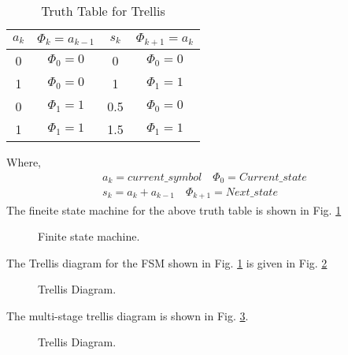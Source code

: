 \documentclass[journal,12pt,twocolumn]{IEEEtran}
\begin{document}
\begin{table}[h]
\caption{Truth Table for Trellis}
\begin{center}
\begin{tabular}{|c|c|c|c|}
\hline
$a_k$ & $\Phi_k = a_{k-1}$ & $s_k$ & $\Phi_{k+1} = a_{k}$ \\
    \hline
    0 &   $\Phi_0 = 0$ & 0 & $\Phi_0 = 0$\\ 
    \hline
    1 &  $\Phi_0 = 0$ & 1 & $\Phi_1 = 1$ \\
    \hline
    0 &  $\Phi_1 = 1$ & 0.5 & $\Phi_0 = 0$ \\
	\hline
	1 &  $\Phi_1 = 1$ & 1.5 & $\Phi_1 = 1$ \\
	\hline
\end{tabular}
\label{table:truthtable}
\end{center}
\end{table}
Where,
\begin{align}
a_k = current\_symbol \quad \Phi_0 = Current\_state \\
s_k = a_k + a_{k-1} \quad \Phi_{k+1} = Next\_state 
\end{align}
The fineite state machine for the above truth table is shown in Fig. \ref{fig:FSM}
\begin{figure}[h]
\centering
\resizebox{\columnwidth}{!}{

}
\caption{Finite state machine. }
\label{fig:FSM}
\end{figure}
The Trellis diagram for the FSM shown in Fig. \ref{fig:FSM} is given in Fig. \ref{fig:trellis}
\begin{figure}[h]
\centering
\resizebox{\columnwidth}{!}{

}
\caption{Trellis Diagram. }
\label{fig:trellis}
\end{figure}

The multi-stage trellis diagram is shown in Fig. \ref{fig:multi-stage}.
\begin{figure}[h]
\centering
\resizebox{\columnwidth}{!}{

}
\caption{Trellis Diagram. }
\label{fig:multi-stage}
\end{figure}
\end{document}
